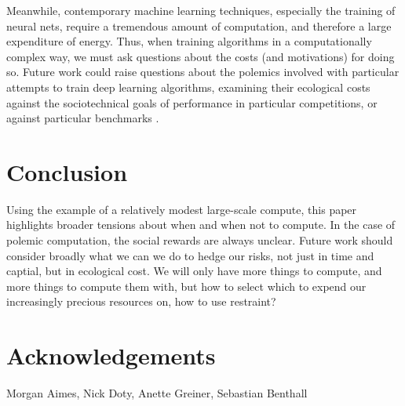 \documentclass[sigconf]{acmart}
\begin{document}
Meanwhile, contemporary machine learning techniques, especially the training of neural nets, 
require a tremendous amount of computation, and therefore a large expenditure of energy.
Thus, when training algorithms in a computationally complex way,
we must ask questions about the costs (and motivations) for doing so.
Future work could raise questions about the polemics involved
with particular attempts to train deep learning algorithms,
examining their ecological costs against the sociotechnical goals 
of performance in particular competitions, or against particular benchmarks \cite{SixSilberman2015}.


\section{Conclusion}
\label{sec:orgf5b867c}

Using the example of a relatively modest large-scale compute,
this paper highlights broader tensions about when and when not to compute.
In the case of polemic computation, the social rewards are always unclear.
Future work should consider broadly what we can we do to hedge our risks, 
not just in time and captial,
but in ecological cost.
We will only have more things to compute,
and more things to compute them with,
but how to select which to expend our increasingly precious resources on, 
how to use restraint?


\section{Acknowledgements}
\label{sec:orgf5105bb}
Morgan Aimes, Nick Doty, Anette Greiner, Sebastian Benthall



\end{document}
